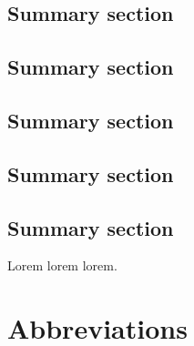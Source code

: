 \documentclass[english,master,unicode]{ctufit-thesis}
\theoremstyle{plain}
\theoremstyle{definition}
\theoremstyle{remark}
\numberwithin{theorem}{chapter}
\begin{document}
\begin{summarypage}
\section*{Summary section}

\lipsum[1][1-8]

\section*{Summary section}

\lipsum[2][1-6]

\section*{Summary section}

\lipsum[3]

\section*{Summary section}

\lipsum[2]

\section*{Summary section}

\lipsum[1][1-8] Lorem lorem lorem.
\end{summarypage}

\chapter{Abbreviations}

\printglossary[type=\acronymtype]
\printglossaries

\mainmatter\mainmatterinit %



\appendix\appendixinit %


\backmatter %

\printbibliography %

\end{document}
